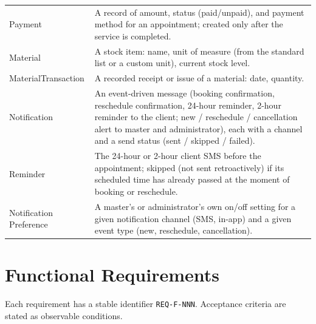 \documentclass[11pt,a4paper]{article}
\begin{document}
\begin{longtable}{L{3.4cm}L{10.6cm}}
Payment & A record of amount, status (paid/unpaid), and payment method for
  an appointment; created only after the service is completed. \\
Material & A stock item: name, unit of measure (from the standard list or a
  custom unit), current stock level. \\
MaterialTransaction & A recorded receipt or issue of a material: date,
  quantity. \\
Notification & An event-driven message (booking confirmation, reschedule
  confirmation, 24-hour reminder, 2-hour reminder to the client; new /
  reschedule / cancellation alert to master and administrator), each with a
  channel and a send status (sent / skipped / failed). \\
Reminder & The 24-hour or 2-hour client SMS before the appointment; skipped
  (not sent retroactively) if its scheduled time has already passed at the
  moment of booking or reschedule. \\
Notification Preference & A master's or administrator's own on/off setting
  for a given notification channel (SMS, in-app) and a given event type
  (new, reschedule, cancellation). \\
\bottomrule
\end{longtable}

\section{Functional Requirements}
\label{sec:functional}

Each requirement has a stable identifier \texttt{REQ-F-NNN}. Acceptance
criteria are stated as observable conditions.
\end{document}
